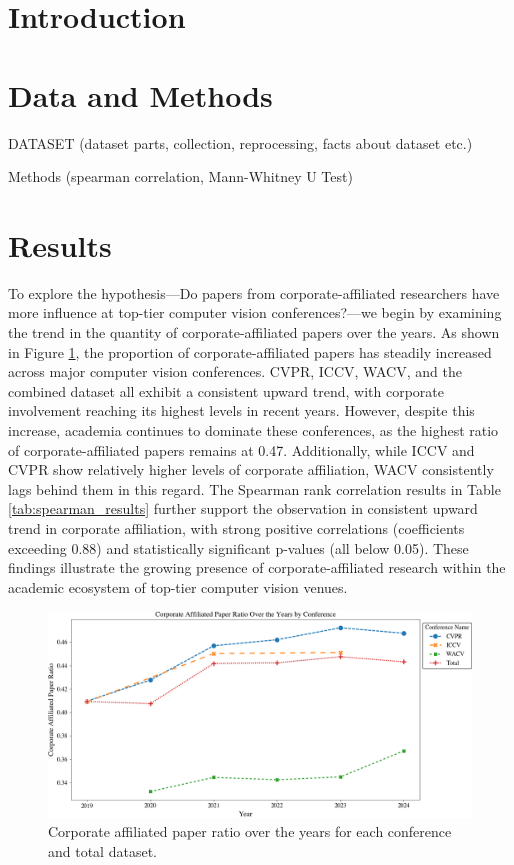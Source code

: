 \documentclass{article}
\begin{document}
\section{Introduction}


\section{Data and Methods}
DATASET (dataset parts, collection, reprocessing, facts about dataset etc.)

Methods (spearman correlation, Mann-Whitney U Test)


\section{Results}
To explore the hypothesis—Do papers from corporate-affiliated researchers have more influence at top-tier computer vision conferences?—we begin by examining the trend in the quantity of corporate-affiliated papers over the years. As shown in Figure \ref{fig:corporate_ratio_graph}, the proportion of corporate-affiliated papers has steadily increased across major computer vision conferences. CVPR, ICCV, WACV, and the combined dataset all exhibit a consistent upward trend, with corporate involvement reaching its highest levels in recent years. However, despite this increase, academia continues to dominate these conferences, as the highest ratio of corporate-affiliated papers remains at 0.47. Additionally, while ICCV and CVPR show relatively higher levels of corporate affiliation, WACV consistently lags behind them in this regard. The Spearman rank correlation results in Table \ref{tab:spearman_results} further support the observation in consistent upward trend in corporate affiliation, with strong positive correlations (coefficients exceeding 0.88) and statistically significant p-values (all below 0.05). These findings illustrate the growing presence of corporate-affiliated research within the academic ecosystem of top-tier computer vision venues.

\begin{figure}[ht]
  \centering
  \includegraphics[width=\textwidth]{report/images/corporate_ratio_graph_final.png}  
  \caption{Corporate affiliated paper ratio over the years for each conference and total dataset.}
  \label{fig:corporate_ratio_graph}
\end{figure}
\end{document}
